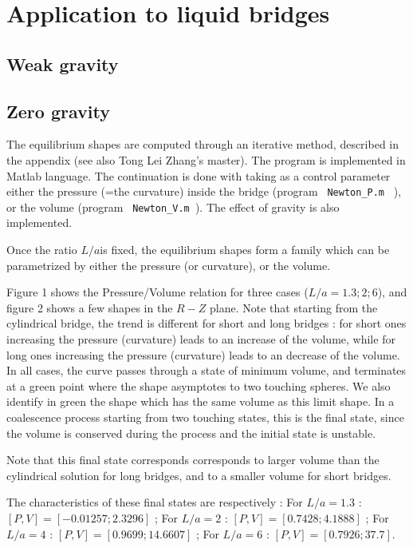 \documentclass{jfm}
\begin{document}
\section{Application to liquid bridges}

\subsection{Weak gravity}

\subsection{Zero gravity}

The equilibrium shapes are computed through an iterative method, described in the appendix (see also Tong Lei Zhang's master). The program is implemented in Matlab language.
The continuation is done with taking as a control parameter either the pressure (=the curvature) inside the bridge (program \verb| Newton_P.m | ), or the volume (program \verb| Newton_V.m |).
The effect of gravity is also implemented.


Once the ratio $L/a$is fixed, the equilibrium shapes form a family which can be parametrized by either the pressure (or curvature), or the volume.

Figure 1 shows the Pressure/Volume relation for three cases ($L/a = 1.3 ; 2 ; 6$),
and figure 2 shows a few shapes in the $R-Z$ plane. Note that starting from the cylindrical bridge, the trend is different for short and long bridges : for short ones increasing the pressure (curvature) leads to an increase of the volume, while for long ones  increasing the pressure (curvature) leads to an decrease of the volume. In all cases, the curve passes through a state of minimum volume, and terminates at a green point where the shape asymptotes to two touching spheres.
We also identify in green the shape which has the same volume as this limit shape. In a coalescence process starting from two touching states, this is the final state, since the volume is conserved during the process and the initial state is unstable.

Note that this final state corresponds corresponds to larger volume than the cylindrical solution for long bridges, and to a smaller volume for short bridges.

The characteristics of these final states are respectively :
For $L/a=1.3$ : $[P,V] = [ -0.01257;  2.3296]$ ; 
For $L/a= 2$ : $[P,V] = [ 0.7428 ;  4.1888 ]$ ; 
For $L/a = 4$ : $[P,V] = [  0.9699 ; 14.6607]$ ;
For $L/a= 6$ : $[P,V] = [0.7926 ; 37.7]$.
\end{document}
